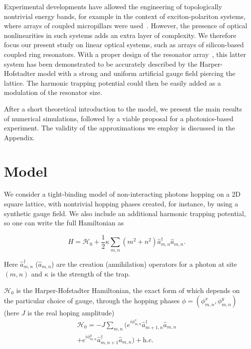 \documentclass[twocolumn, 10pt, aps, superscriptaddress, floatfix, showpacs, pra, citeautoscript]{revtex4-1}
\newcommand{\co}[2]{#2}
\renewcommand{\paragraph}{\co}
\begin{document}
\paragraph{Hafezi's arrays could be used for HH physics.}
Experimental developments have allowed the engineering of
topologically nontrivial energy bands, for example in the context of
exciton-polariton systems, where arrays of coupled micropillars were
used~\cite{jacqmin2014dirac}. However, the presence of optical
nonlinearities in such systems adds an extra layer of complexity.  We
therefore focus our present study on linear optical systems, such as
arrays of silicon-based coupled ring resonators.  With a proper design
of the resonator array~\cite{hafezi2013imaging}, this latter system
has been demonstrated to be accurately described by the
Harper-Hofstadter model with a strong and uniform artificial gauge
field piercing the lattice.  The harmonic trapping potential could
then be easily added as a modulation of the resonator size.


\paragraph{Summary of the manuscript}
After a short theoretical introduction to the model, we present the
main results of numerical simulations, followed by a viable proposal
for a photonics-based experiment. The validity of the approximations
we employ is discussed in the Appendix.

\section{Model}
\label{sec:model}

We consider a tight-binding model of non-interacting photons hopping
on a 2D square lattice, with nontrivial hopping phases created, for
instance, by using a synthetic gauge field. We also include an
additional harmonic trapping potential, so one can write the full Hamiltonian as

\begin{equation}\label{eq:model}
H=\mathcal{H}_0+\frac{1}{2}\kappa
\sum_{m,n}(m^{2}+n^{2})\hat{a}_{m,n}^{\dagger}\hat{a}_{m,n}.
\end{equation}

Here $\hat{a}_{m,n}^{\dagger}$ ($\hat{a}_{m,n}$) are the creation
(annihilation) operators for a photon at site $(m,n)$ and $\kappa$ is the
strength of the trap.

$\mathcal{H}_0$ is the Harper-Hofstadter Hamiltonian, the exact form
of which depends on the particular choice of gauge, through the
hopping phases $\phi = (\phi_{m,n}^x, \phi_{m,n}^y)$ (here $J$ is the real hoping
amplitude)
%
\begin{multline}\label{eq:hh_hamiltonian}
\mathcal{H}_0=-J\sum_{m,n}(e^{i \phi_{m,n}^x}\hat{a}_{m+1,n}^{\dagger}\hat{a}_{m,n}\\
+e^{i \phi_{m,n}^y}\hat{a}_{m,n+1}^{\dagger}\hat{a}_{m,n}) + \text{h.c.}
\end{multline}
\end{document}
